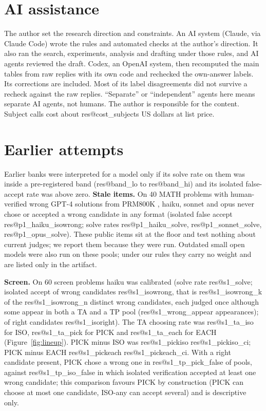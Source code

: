 \documentclass[10pt,twocolumn]{article}
\makeatletter
\newcommand{\res}[1]{\csname res@#1\endcsname}
\makeatother
\begin{document}
\section*{AI assistance}
The author set the research direction and constraints. An AI system (Claude, via Claude Code) wrote the rules and automated checks at the author's direction. It also ran the search, experiments, analysis and drafting under those rules, and AI agents reviewed the draft. Codex, an OpenAI system, then recomputed the main tables from raw replies with its own code and rechecked the own-answer labels. Its corrections are included. Most of its label disagreements did not survive a recheck against the raw replies. ``Separate'' or ``independent'' agents here means separate AI agents, not humans. The author is responsible for the content. Subject calls cost about \res{cost_subjects} US dollars at list price.




\appendix
\section{Earlier attempts}\label{app:early}
Earlier banks were interpreted for a model only if its solve rate on them was inside a pre-registered band (\res{band_lo} to \res{band_hi}) and its isolated false-accept rate was above zero. \textbf{Stale items.} On 40 MATH problems with human-verified wrong GPT-4 solutions from PRM800K \citep{lightman2024lets,hendrycks2021measuring}, haiku, sonnet and opus never chose or accepted a wrong candidate in any format (isolated false accept \res{p1_haiku_isowrong}; solve rates \res{p1_haiku_solve}, \res{p1_sonnet_solve}, \res{p1_opus_solve}). These public items sit at the floor and test nothing about current judges; we report them because they were run. Outdated small open models were also run on these pools; under our rules they carry no weight and are listed only in the artifact.

\textbf{Screen.} On 60 screen problems haiku was calibrated (solve rate \res{s1_solve}; isolated accept of wrong candidates \res{s1_isowrong}, that is \res{s1_isowrong_k} of the \res{s1_isowrong_n} distinct wrong candidates, each judged once although some appear in both a TA and a TP pool (\res{s1_wrong_appear} appearances); of right candidates \res{s1_isoright}). The TA choosing rate was \res{s1_ta_iso} for ISO, \res{s1_ta_pick} for PICK and \res{s1_ta_each} for EACH (Figure~\ref{fig:lineup}). PICK minus ISO was \res{s1_pickiso} \res{s1_pickiso_ci}; PICK minus EACH \res{s1_pickeach} \res{s1_pickeach_ci}. With a right candidate present, PICK chose a wrong one in \res{s1_tp_pick_false} of pools, against \res{s1_tp_iso_false} in which isolated verification accepted at least one wrong candidate; this comparison favours PICK by construction (PICK can choose at most one candidate, ISO-any can accept several) and is descriptive only.
\end{document}
